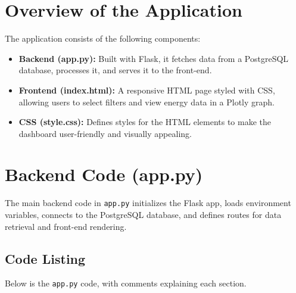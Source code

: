 \section{Overview of the Application}


The application consists of the following components:
\begin{itemize}
    \item \textbf{Backend (app.py):} Built with Flask, it fetches data from a PostgreSQL database, processes it, and serves it to the front-end.
    \item \textbf{Frontend (index.html):} A responsive HTML page styled with CSS, allowing users to select filters and view energy data in a Plotly graph.
    \item \textbf{CSS (style.css):} Defines styles for the HTML elements to make the dashboard user-friendly and visually appealing.
\end{itemize}

\section{Backend Code (app.py)}

The main backend code in \texttt{app.py} initializes the Flask app, loads environment variables, connects to the PostgreSQL database, and defines routes for data retrieval and front-end rendering.

\subsection{Code Listing}
Below is the \texttt{app.py} code, with comments explaining each section.

